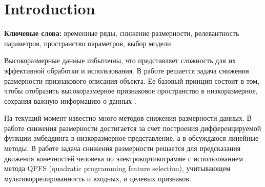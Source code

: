 \documentclass[12pt, twoside]{article}
\begin{document}
\begin{comment}
В работе исследуется проблема снижения размерности пространства параметров модели. В ее рамках решается задача восстановления временного ряда. В качестве модели восстановления ряда используются различные автоенкодеры. В работе проводится метрический анализ пространства параметров автоенкодера. Новизна заключается в том, что отдельные параметры модели - случайные величины - собираются в векторы – многомерные случайные величины, анализ взаимного расположения которых в пространстве и представляет предмет исследования нашей работы. Этот анализ позволит снизить количество параметров модели, сделать выводы о значимости параметров, произвести их отбор. Для определения положения вектора параметров в пространстве оцениваются его матожидание и матрица ковариации с помощью методов bootstrap и variational inference. Эксперименты проводятся на моделях SSA, RNN и VAE на задачах предсказания синтетических временных рядов, квазипериодических показаний акселерометра, периодических видеоданных.
\end{comment}




\section{Introduction}
\textbf{Ключевые слова:} временные ряды, снижение размерности, релевантность параметров, пространство параметров, выбор модели.






Высокоразмерные данные избыточны, что представляет сложность для их эффективной обработки и использования. В работе решается задача снижения размерности признакового описания объекта.
Ее базовый принцип состоит в том, чтобы отобразить высокоразмерное признаковое пространство в низкоразмерное, сохраняя важную информацию о данных \citep{jia2022feature}.

На текущий момент известно много методов снижения размерности данных. В работе \citep{ornek2019nonlinear} снижения размерности достигается за счет построения дифференцируемой функции эмбеддинга в низкоразмерное представление, а в \citep{cunningham2014dimensionality} обсуждаюся линейные методы. В работе \citep{isachenko2022quadratic} задача снижения размерности решается для предсказания движения конечностей человека по электрокортикограмме с использованием  метода QPFS (quadratic programming feature selection), учитывающем мультикоррелированность и входных, и целевых признаков.
\end{document}
